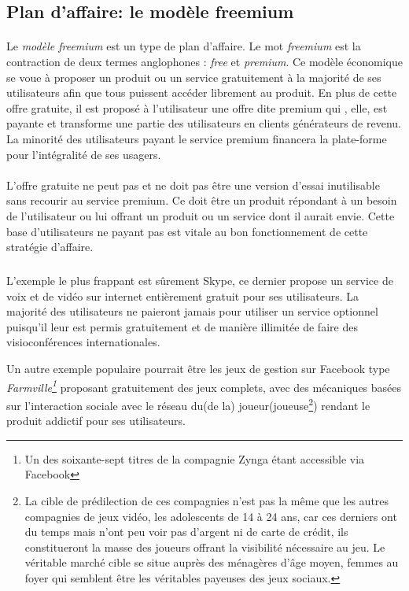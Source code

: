 \documentclass[11pt, a4paper ]{article}
\begin{document}
\begin{spacing}{1.5}
			\subsection{Plan d'affaire: le modèle freemium} %

\paragraph{}
Le \emph{modèle freemium} est un type de plan d'affaire. Le mot \emph{freemium} est la contraction de deux termes anglophones : \emph{free} et \emph{premium}. Ce modèle économique se voue à proposer un produit ou un service gratuitement à la majorité de ses utilisateurs afin que tous puissent accéder librement au produit. En plus de cette offre gratuite, il est proposé à l'utilisateur une offre dite premium qui , elle, est payante et transforme une partie des utilisateurs en clients générateurs de revenu. La minorité des utilisateurs payant le service premium financera la plate-forme pour l'intégralité de ses usagers.


\paragraph{} %
L'offre gratuite ne peut pas et ne doit pas être une version d'essai inutilisable sans recourir au service premium. Ce doit être un produit répondant à un besoin de l'utilisateur ou lui offrant un produit ou un service dont il aurait envie. Cette base d'utilisateurs ne payant pas est vitale au bon fonctionnement de cette stratégie d'affaire.

\subparagraph{} %
L'exemple le plus frappant est sûrement Skype, ce dernier propose un service de voix et de vidéo sur internet entièrement gratuit pour ses utilisateurs. La majorité des utilisateurs ne paieront jamais pour utiliser un service optionnel puisqu'il leur est permis gratuitement et de manière illimitée de faire des visioconférences internationales.

Un autre exemple populaire pourrait être les jeux de gestion sur Facebook type \emph{Farmville\footnote{Un des soixante-sept titres de la compagnie Zynga étant accessible via Facebook}} proposant gratuitement des jeux complets, avec des mécaniques basées sur l'interaction sociale avec le réseau du(de la) joueur(joueuse\footnote{La cible de prédilection de ces compagnies n'est pas la même que les autres compagnies de jeux vidéo, les adolescents de 14 à 24 ans, car ces derniers ont du temps mais n'ont peu voir pas d'argent ni de carte de crédit, ils constitueront la masse des joueurs offrant la visibilité nécessaire au jeu. Le véritable marché cible se situe auprès des ménagères d'âge moyen, femmes au foyer qui semblent être les véritables payeuses des jeux sociaux.}) rendant le produit addictif pour ses utilisateurs.


\end{spacing}
\end{document}

